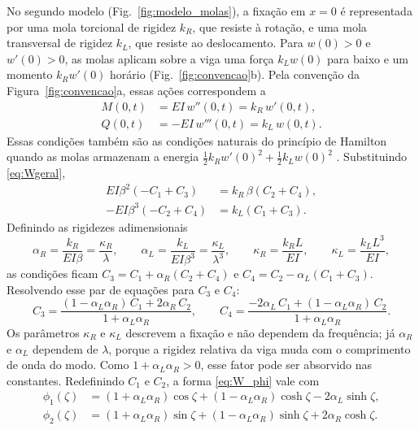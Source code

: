 No segundo modelo (Fig.~\ref{fig:modelo_molas}), a fixação em $x=0$ é representada
por uma mola torcional de rigidez $k_R$, que resiste à rotação, e uma mola transversal
de rigidez $k_L$, que resiste ao deslocamento. Para $w(0) > 0$ e $w'(0) > 0$, as
molas aplicam sobre a viga uma força $k_L w(0)$ para baixo e um momento
$k_R w'(0)$ horário (Fig.~\ref{fig:convencao}b). Pela convenção da
Figura~\ref{fig:convencao}a, essas ações correspondem a
\begin{subequations}
    \label{eq:cc_molas}
    \begin{align}
        M(0,t) & = EI\,w''(0,t) = k_R\,w'(0,t), \label{eq:cc_molas_M}  \\
        Q(0,t) & = -EI\,w'''(0,t) = k_L\,w(0,t). \label{eq:cc_molas_Q}
    \end{align}
\end{subequations}
Essas condições também são as condições naturais do princípio de Hamilton quando as
molas armazenam a energia $\tfrac12 k_R w'(0)^2 + \tfrac12 k_L w(0)^2$
\cite{meirovitch2001}. Substituindo \eqref{eq:Wgeral},
\begin{align*}
    EI\beta^2\left(-C_1 + C_3\right)  & = k_R\,\beta\left(C_2 + C_4\right), \\
    -EI\beta^3\left(-C_2 + C_4\right) & = k_L\left(C_1 + C_3\right).
\end{align*}
Definindo as rigidezes adimensionais
\begin{equation}
    \alpha_R = \frac{k_R}{EI\beta} = \frac{\kappa_R}{\lambda}, \qquad
    \alpha_L = \frac{k_L}{EI\beta^3} = \frac{\kappa_L}{\lambda^3}, \qquad
    \kappa_R = \frac{k_R L}{EI}, \qquad \kappa_L = \frac{k_L L^3}{EI},
    \label{eq:alphas}
\end{equation}
as condições ficam $C_3 = C_1 + \alpha_R(C_2 + C_4)$ e
$C_4 = C_2 - \alpha_L(C_1 + C_3)$. Resolvendo esse par de equações para $C_3$ e $C_4$:
\begin{equation}
    C_3 = \frac{(1 - \alpha_L\alpha_R)\,C_1 + 2\alpha_R\,C_2}{1 + \alpha_L\alpha_R},
    \qquad
    C_4 = \frac{-2\alpha_L\,C_1 + (1 - \alpha_L\alpha_R)\,C_2}{1 + \alpha_L\alpha_R}.
    \label{eq:C3C4_molas}
\end{equation}
Os parâmetros $\kappa_R$ e $\kappa_L$ descrevem a fixação e não dependem da
frequência; já $\alpha_R$ e $\alpha_L$ dependem de $\lambda$, porque a rigidez relativa
da viga muda com o comprimento de onda do modo. Como $1 + \alpha_L\alpha_R > 0$, esse
fator pode ser absorvido nas constantes. Redefinindo $C_1$ e $C_2$, a forma
\eqref{eq:W_phi} vale com
\begin{subequations}
    \label{eq:phi_molas}
    \begin{align}
        \phi_1(\zeta) & = (1 + \alpha_L\alpha_R)\cos\zeta
        + (1 - \alpha_L\alpha_R)\cosh\zeta - 2\alpha_L\sinh\zeta, \\
        \phi_2(\zeta) & = (1 + \alpha_L\alpha_R)\sin\zeta
        + (1 - \alpha_L\alpha_R)\sinh\zeta + 2\alpha_R\cosh\zeta.
    \end{align}
\end{subequations}

